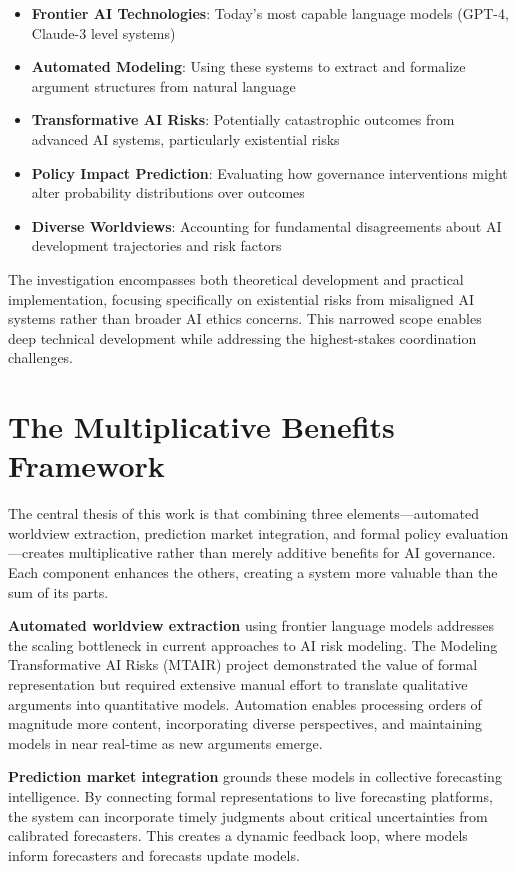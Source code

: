 \documentclass[
  11pt,
  letterpaper,
]{book}
\providecommand{\tightlist}{%
  \setlength{\itemsep}{0pt}\setlength{\parskip}{0pt}}
\begin{document}
\begin{itemize}
\tightlist
\item
  \textbf{Frontier AI Technologies}: Today's most capable language
  models (GPT-4, Claude-3 level systems)
\item
  \textbf{Automated Modeling}: Using these systems to extract and
  formalize argument structures from natural language
\item
  \textbf{Transformative AI Risks}: Potentially catastrophic outcomes
  from advanced AI systems, particularly existential risks
\item
  \textbf{Policy Impact Prediction}: Evaluating how governance
  interventions might alter probability distributions over outcomes
\item
  \textbf{Diverse Worldviews}: Accounting for fundamental disagreements
  about AI development trajectories and risk factors
\end{itemize}

The investigation encompasses both theoretical development and practical
implementation, focusing specifically on existential risks from
misaligned AI systems rather than broader AI ethics concerns. This
narrowed scope enables deep technical development while addressing the
highest-stakes coordination challenges.

\section{The Multiplicative Benefits
Framework}\label{sec-multiplicative-benefits}

The central thesis of this work is that combining three
elements---automated worldview extraction, prediction market
integration, and formal policy evaluation---creates multiplicative
rather than merely additive benefits for AI governance. Each component
enhances the others, creating a system more valuable than the sum of its
parts.

\textbf{Automated worldview extraction} using frontier language models
addresses the scaling bottleneck in current approaches to AI risk
modeling. The Modeling Transformative AI Risks (MTAIR) project
demonstrated the value of formal representation but required extensive
manual effort to translate qualitative arguments into quantitative
models. Automation enables processing orders of magnitude more content,
incorporating diverse perspectives, and maintaining models in near
real-time as new arguments emerge.

\textbf{Prediction market integration} grounds these models in
collective forecasting intelligence. By connecting formal
representations to live forecasting platforms, the system can
incorporate timely judgments about critical uncertainties from
calibrated forecasters. This creates a dynamic feedback loop, where
models inform forecasters and forecasts update models.
\end{document}
